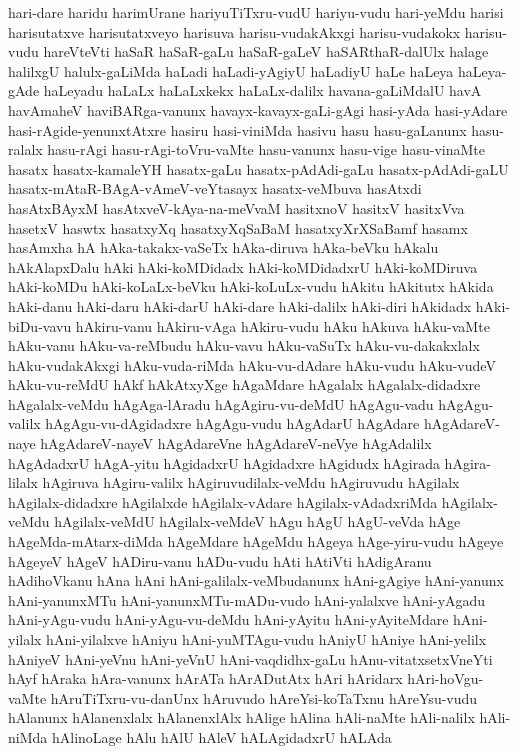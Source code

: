 {hari-dare
haridu
harimUrane
hariyuTiTxru-vudU
hariyu-vudu
hari-yeMdu
harisi
harisutatxve
harisutatxveyo
harisuva
harisu-vudakAkxgi
harisu-vudakokx
harisu-vudu
hareVteVti
haSaR
haSaR-gaLu
haSaR-gaLeV
haSARthaR-dalUlx
halage
halilxgU
halulx-gaLiMda
haLadi
haLadi-yAgiyU
haLadiyU
haLe
haLeya
haLeya-gAde
haLeyadu
haLaLx
haLaLxkekx
haLaLx-dalilx
havana-gaLiMdalU
havA
havAmaheV
haviBARga-vanunx
havayx-kavayx-gaLi-gAgi
hasi-yAda
hasi-yAdare
hasi-rAgide-yenunxtAtxre
hasiru
hasi-viniMda
hasivu
hasu
hasu-gaLanunx
hasu-ralalx
hasu-rAgi
hasu-rAgi-toVru-vaMte
hasu-vanunx
hasu-vige
hasu-vinaMte
hasatx
hasatx-kamaleYH
hasatx-gaLu
hasatx-pAdAdi-gaLu
hasatx-pAdAdi-gaLU
hasatx-mAtaR-BAgA-vAmeV-veYtasayx
hasatx-veMbuva
hasAtxdi
hasAtxBAyxM
hasAtxveV-kAya-na-meVvaM
hasitxnoV
hasitxV
hasitxVva
hasetxV
haswtx
hasatxyXq
hasatxyXqSaBaM
hasatxyXrXSaBamf
hasamx
hasAmxha
hA
hAka-takakx-vaSeTx
hAka-diruva
hAka-beVku
hAkalu
hAkAlapxDalu
hAki
hAki-koMDidadx
hAki-koMDidadxrU
hAki-koMDiruva
hAki-koMDu
hAki-koLaLx-beVku
hAki-koLuLx-vudu
hAkitu
hAkitutx
hAkida
hAki-danu
hAki-daru
hAki-darU
hAki-dare
hAki-dalilx
hAki-diri
hAkidadx
hAki-biDu-vavu
hAkiru-vanu
hAkiru-vAga
hAkiru-vudu
hAku
hAkuva
hAku-vaMte
hAku-vanu
hAku-va-reMbudu
hAku-vavu
hAku-vaSuTx
hAku-vu-dakakxlalx
hAku-vudakAkxgi
hAku-vuda-riMda
hAku-vu-dAdare
hAku-vudu
hAku-vudeV
hAku-vu-reMdU
hAkf
hAkAtxyXge
hAgaMdare
hAgalalx
hAgalalx-didadxre
hAgalalx-veMdu
hAgAga-lAradu
hAgAgiru-vu-deMdU
hAgAgu-vadu
hAgAgu-valilx
hAgAgu-vu-dAgidadxre
hAgAgu-vudu
hAgAdarU
hAgAdare
hAgAdareV-naye
hAgAdareV-nayeV
hAgAdareVne
hAgAdareV-neVye
hAgAdalilx
hAgAdadxrU
hAgA-yitu
hAgidadxrU
hAgidadxre
hAgidudx
hAgirada
hAgira-lilalx
hAgiruva
hAgiru-valilx
hAgiruvudilalx-veMdu
hAgiruvudu
hAgilalx
hAgilalx-didadxre
hAgilalxde
hAgilalx-vAdare
hAgilalx-vAdadxriMda
hAgilalx-veMdu
hAgilalx-veMdU
hAgilalx-veMdeV
hAgu
hAgU
hAgU-veVda
hAge
hAgeMda-mAtarx-diMda
hAgeMdare
hAgeMdu
hAgeya
hAge-yiru-vudu
hAgeye
hAgeyeV
hAgeV
hADiru-vanu
hADu-vudu
hAti
hAtiVti
hAdigAranu
hAdihoVkanu
hAna
hAni
hAni-galilalx-veMbudanunx
hAni-gAgiye
hAni-yanunx
hAni-yanunxMTu
hAni-yanunxMTu-mADu-vudo
hAni-yalalxve
hAni-yAgadu
hAni-yAgu-vudu
hAni-yAgu-vu-deMdu
hAni-yAyitu
hAni-yAyiteMdare
hAni-yilalx
hAni-yilalxve
hAniyu
hAni-yuMTAgu-vudu
hAniyU
hAniye
hAni-yelilx
hAniyeV
hAni-yeVnu
hAni-yeVnU
hAni-vaqdidhx-gaLu
hAnu-vitatxsetxVneYti
hAyf
hAraka
hAra-vanunx
hArATa
hArADutAtx
hAri
hAridarx
hAri-hoVgu-vaMte
hAruTiTxru-vu-danUnx
hAruvudo
hAreYsi-koTaTxnu
hAreYsu-vudu
hAlanunx
hAlanenxlalx
hAlanenxlAlx
hAlige
hAlina
hAli-naMte
hAli-nalilx
hAli-niMda
hAlinoLage
hAlu
hAlU
hAleV
hALAgidadxrU
hALAda
}
